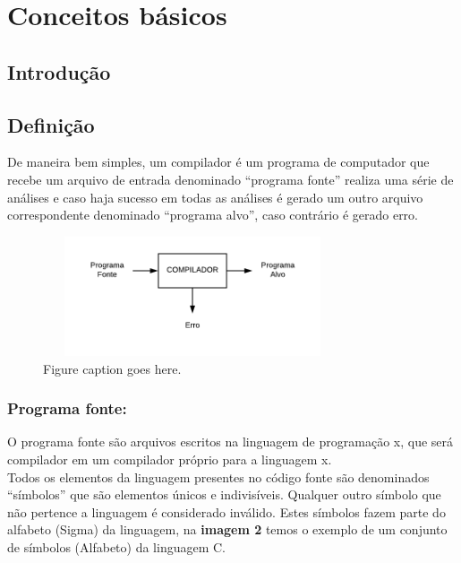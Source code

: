 \chapter{Conceitos básicos}


\section{Introdução}\label{intro}

\section{Definição}\label{intro}
De maneira bem simples, um compilador é um programa de computador que recebe um arquivo de entrada denominado “programa fonte” realiza uma série de análises e caso haja sucesso em todas as análises é gerado um outro arquivo correspondente denominado “programa alvo”, caso contrário é gerado erro.

\begin{figure}
\includegraphics[width=250pt, height=100pt]{chapters/chapter1/figures/imagem1.png}
\caption[List of figure caption goes here]{Figure caption goes here.}
\end{figure}

\subsection{Programa fonte:} 
O programa fonte são arquivos escritos na linguagem de programação x, que será compilador em um compilador próprio para a linguagem x.\\

Todos os elementos  da linguagem presentes no código fonte são denominados “símbolos” que são elementos únicos e indivisíveis. Qualquer outro símbolo que não pertence a linguagem é considerado inválido. Estes símbolos fazem parte do alfabeto (Sigma) da linguagem, na \textbf{imagem 2}  temos o exemplo de um conjunto de símbolos (Alfabeto) da linguagem C.\\



